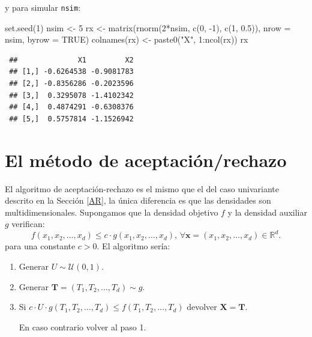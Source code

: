 \documentclass[
]{book}
\newenvironment{Shaded}{\begin{snugshade}}{\end{snugshade}}
\newcommand{\AttributeTok}[1]{\textcolor[rgb]{0.77,0.63,0.00}{#1}}
\newcommand{\ConstantTok}[1]{\textcolor[rgb]{0.00,0.00,0.00}{#1}}
\newcommand{\DecValTok}[1]{\textcolor[rgb]{0.00,0.00,0.81}{#1}}
\newcommand{\FloatTok}[1]{\textcolor[rgb]{0.00,0.00,0.81}{#1}}
\newcommand{\FunctionTok}[1]{\textcolor[rgb]{0.00,0.00,0.00}{#1}}
\newcommand{\NormalTok}[1]{#1}
\newcommand{\OtherTok}[1]{\textcolor[rgb]{0.56,0.35,0.01}{#1}}
\newcommand{\SpecialCharTok}[1]{\textcolor[rgb]{0.00,0.00,0.00}{#1}}
\newcommand{\StringTok}[1]{\textcolor[rgb]{0.31,0.60,0.02}{#1}}
\theoremstyle{break}
\theoremstyle{nonumberplain}
\begin{document}
y para simular \texttt{nsim}:

\begin{Shaded}
\begin{Highlighting}[]
\FunctionTok{set.seed}\NormalTok{(}\DecValTok{1}\NormalTok{)}
\NormalTok{nsim }\OtherTok{\textless{}{-}} \DecValTok{5}
\NormalTok{rx }\OtherTok{\textless{}{-}} \FunctionTok{matrix}\NormalTok{(}\FunctionTok{rnorm}\NormalTok{(}\DecValTok{2}\SpecialCharTok{*}\NormalTok{nsim, }\FunctionTok{c}\NormalTok{(}\DecValTok{0}\NormalTok{, }\SpecialCharTok{{-}}\DecValTok{1}\NormalTok{), }\FunctionTok{c}\NormalTok{(}\DecValTok{1}\NormalTok{, }\FloatTok{0.5}\NormalTok{)), }\AttributeTok{nrow =}\NormalTok{ nsim, }\AttributeTok{byrow =} \ConstantTok{TRUE}\NormalTok{)}
\FunctionTok{colnames}\NormalTok{(rx) }\OtherTok{\textless{}{-}} \FunctionTok{paste0}\NormalTok{(}\StringTok{"X"}\NormalTok{, }\DecValTok{1}\SpecialCharTok{:}\FunctionTok{ncol}\NormalTok{(rx))}
\NormalTok{rx}
\end{Highlighting}
\end{Shaded}

\begin{verbatim}
 ##              X1         X2
 ## [1,] -0.6264538 -0.9081783
 ## [2,] -0.8356286 -0.2023596
 ## [3,]  0.3295078 -1.4102342
 ## [4,]  0.4874291 -0.6308376
 ## [5,]  0.5757814 -1.1526942
\end{verbatim}

\hypertarget{el-muxe9todo-de-aceptaciuxf3nrechazo}{%
\section{El método de aceptación/rechazo}\label{el-muxe9todo-de-aceptaciuxf3nrechazo}}

El algoritmo de aceptación-rechazo es el mismo que el del caso univariante descrito en la Sección \ref{AR}, la única diferencia es que las densidades son multidimensionales.
Supongamos que la densidad objetivo \(f\) y la densidad
auxiliar \(g\) verifican:
\[f\left( x_1,x_2,\ldots,x_d\right) \leq c\cdot g\left( x_1,x_2,\ldots,x_d\right) 
\text{, }\forall \mathbf{x} = \left( x_1,x_2,\ldots,x_d\right)\in \mathbb{R}^d\text{.}\]
para una constante \(c>0\).
El algoritmo sería:

\begin{enumerate}
\def\labelenumi{\arabic{enumi}.}
\item
  Generar \(U\sim \mathcal{U}\left( 0,1\right)\).
\item
  Generar \(\mathbf{T} = \left( T_1,T_2,\ldots,T_d\right) \sim g\).
\item
  Si \(c\cdot U\cdot g\left( T_1,T_2,\ldots,T_d\right) \leq f\left( T_1,T_2,\ldots,T_d\right)\)
  devolver \(\mathbf{X}=\mathbf{T}\).

  En caso contrario volver al paso 1.
\end{enumerate}
\end{document}
